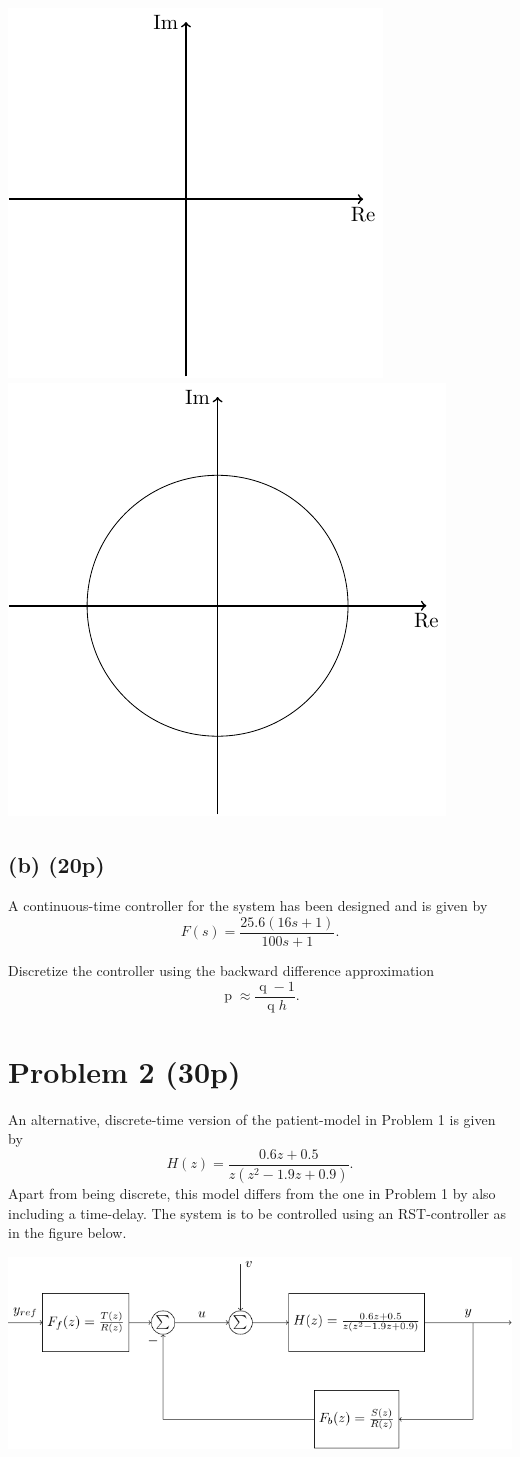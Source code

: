 \documentclass[a4paper]{scrartcl}
\begin{document}
\begin{center}
\includegraphics[width=0.4\linewidth]{imaginary-plane-empty-cartesian}
\includegraphics[width=0.4\linewidth]{imaginary-plane-empty}
\end{center}
\subsection*{(b) (20p)}
\label{sec-1-2}
A continuous-time controller for the system has been designed and is given by 
\[ F(s) = \frac{25.6(16s+1)}{100s+1}. \]

Discretize the controller using the backward difference approximation
\[ \operatorname{p} \approx \frac{\operatorname{q}-1}{\operatorname{q}h}. \]

\section*{Problem 2 (30p)}
\label{sec-2}
An alternative, discrete-time version of the patient-model in Problem 1 is given by
\[ H(z) = \frac{0.6z + 0.5}{z(z^2 - 1.9z + 0.9)}. \]
Apart from being discrete, this model differs from the one in Problem 1 by also including a time-delay.  The system is to be controlled using an RST-controller as in the figure below.
\begin{center}
\includegraphics[width=\linewidth]{rst-block}
\end{center}
\end{document}
